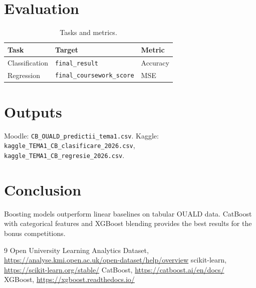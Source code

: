 \documentclass[11pt,a4paper]{article}
\begin{document}
\section{Evaluation}
\begin{table}[h]
\centering
\begin{tabular}{lll}
\toprule
Task & Target & Metric \\
\midrule
Classification & \texttt{final\_result} & Accuracy \\
Regression & \texttt{final\_coursework\_score} & MSE \\
\bottomrule
\end{tabular}
\caption{Tasks and metrics.}
\end{table}

\section{Outputs}
Moodle: \texttt{CB\_OUALD\_predictii\_tema1.csv}. Kaggle: \texttt{kaggle\_TEMA1\_CB\_clasificare\_2026.csv}, \texttt{kaggle\_TEMA1\_CB\_regresie\_2026.csv}.

\section{Conclusion}
Boosting models outperform linear baselines on tabular OUALD data. CatBoost with categorical features and XGBoost blending provides the best results for the bonus competitions.

\begin{thebibliography}{9}
 Open University Learning Analytics Dataset, \url{https://analyse.kmi.open.ac.uk/open-dataset/help/overview}
 scikit-learn, \url{https://scikit-learn.org/stable/}
 CatBoost, \url{https://catboost.ai/en/docs/}
 XGBoost, \url{https://xgboost.readthedocs.io/}
\end{thebibliography}
\end{document}
